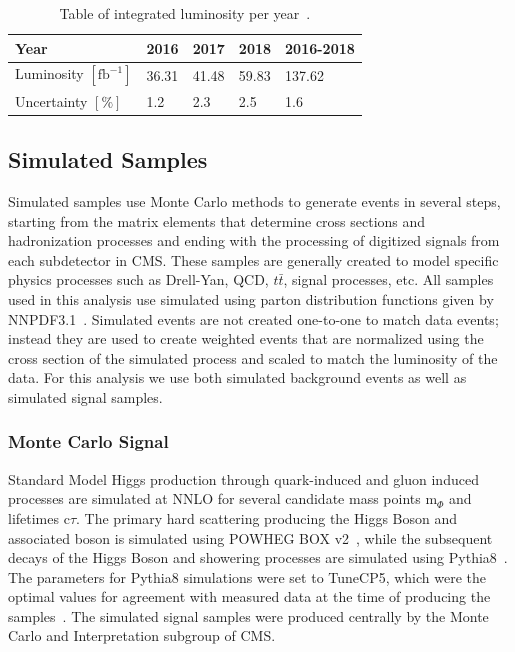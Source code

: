 \begin{table}[h]
	\centering
	\caption[Table of integrated luminosity per year~\cite{cmslumi2016,cmslumi2017,cmslumi2018}.]{Table of integrated luminosity per year~\cite{cmslumi2016,cmslumi2017,cmslumi2018}.}
	\label{tab:intLumi}
	\begin{tabular}{l|l|l|l|l}\hline
		Year & 2016 & 2017 & 2018 & 2016-2018\\
		\hline
		\hline
		Luminosity $[\text{fb}^{-1}]$ & 36.31 & 41.48 & 59.83 & 137.62\\
		\hline	
		Uncertainty $[\%]$ & 1.2 & 2.3 & 2.5 & 1.6\\
		\hline
	\end{tabular}
\end{table}

\subsection{Simulated Samples} \label{sec:ana_mc}
Simulated samples use Monte Carlo methods to generate events in several steps, starting from the matrix elements that determine cross sections and hadronization processes and ending with the processing of digitized signals from each subdetector in CMS. These samples are generally created to model specific physics processes such as Drell-Yan, QCD, $t\bar{t}$, signal processes, etc. All samples used in this analysis use simulated using parton distribution functions given by NNPDF3.1~\cite{nnpdf3p1}. Simulated events are not created one-to-one to match data events; instead they are used to create weighted events that are normalized using the cross section of the simulated process and scaled to match the luminosity of the data. For this analysis we use both simulated background events as well as simulated signal samples.

\subsubsection{Monte Carlo Signal} \label{sec:ana_mcsig}
Standard Model Higgs production through quark-induced and gluon induced \ZH processes are simulated at NNLO for several candidate mass points m$_\Phi$ and lifetimes c$\tau$. The primary hard scattering producing the Higgs Boson and associated \VZ boson is simulated using POWHEG BOX v2~\cite{powheg}, while the subsequent decays of the Higgs Boson and showering processes are simulated using Pythia8~\cite{pythia8}. The parameters for Pythia8 simulations were set to TuneCP5, which were the optimal values for agreement with measured data at the time of producing the samples~\cite{tunecp5}. The simulated signal samples were produced centrally by the Monte Carlo and Interpretation subgroup of CMS.

